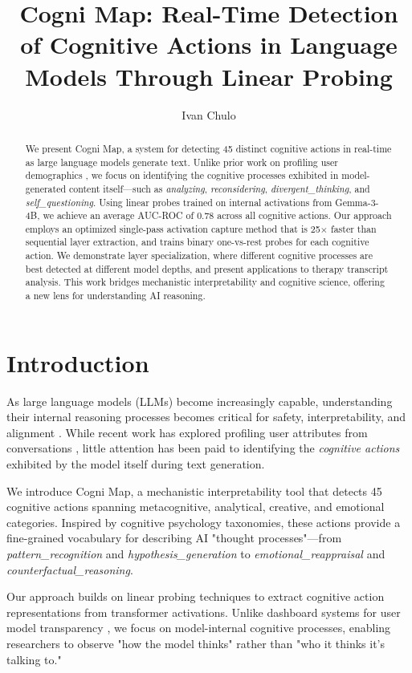 \documentclass[letterpaper]{article}
\title{Cogni Map: Real-Time Detection of Cognitive Actions in Language Models Through Linear Probing}
\author{
    Ivan Chulo
}
\begin{document}
\maketitle

\begin{abstract}
We present Cogni Map, a system for detecting 45 distinct cognitive actions in real-time as large language models generate text. Unlike prior work on profiling user demographics \cite{chen2024designing}, we focus on identifying the cognitive processes exhibited in model-generated content itself---such as \textit{analyzing}, \textit{reconsidering}, \textit{divergent\_thinking}, and \textit{self\_questioning}. Using linear probes trained on internal activations from Gemma-3-4B, we achieve an average AUC-ROC of 0.78 across all cognitive actions. Our approach employs an optimized single-pass activation capture method that is 25$\times$ faster than sequential layer extraction, and trains binary one-vs-rest probes for each cognitive action. We demonstrate layer specialization, where different cognitive processes are best detected at different model depths, and present applications to therapy transcript analysis. This work bridges mechanistic interpretability and cognitive science, offering a new lens for understanding AI reasoning.
\end{abstract}

\section{Introduction}

As large language models (LLMs) become increasingly capable, understanding their internal reasoning processes becomes critical for safety, interpretability, and alignment \cite{bereska2024mechanistic}. While recent work has explored profiling user attributes from conversations \cite{chen2024designing}, little attention has been paid to identifying the \textit{cognitive actions} exhibited by the model itself during text generation.

We introduce Cogni Map, a mechanistic interpretability tool that detects 45 cognitive actions spanning metacognitive, analytical, creative, and emotional categories. Inspired by cognitive psychology taxonomies, these actions provide a fine-grained vocabulary for describing AI "thought processes"---from \textit{pattern\_recognition} and \textit{hypothesis\_generation} to \textit{emotional\_reappraisal} and \textit{counterfactual\_reasoning}.

Our approach builds on linear probing techniques \cite{alain2016understanding, zou2023representation} to extract cognitive action representations from transformer activations. Unlike dashboard systems for user model transparency \cite{chen2024designing}, we focus on model-internal cognitive processes, enabling researchers to observe "how the model thinks" rather than "who it thinks it's talking to."
\end{document}
